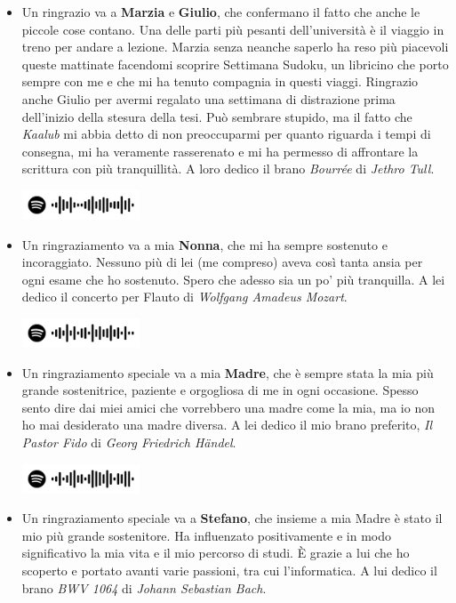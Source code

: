 \documentclass[./main.tex]{subfiles}
\begin{document}
\begin{itemize}
    \item Un ringrazio va a \textbf{Marzia} e \textbf{Giulio}, che confermano il fatto che anche le piccole cose contano.
    Una delle parti più pesanti dell'università è il viaggio in treno per andare a lezione.
    Marzia senza neanche saperlo ha reso più piacevoli queste mattinate facendomi scoprire Settimana Sudoku,
    un libricino che porto sempre con me e che mi ha tenuto compagnia in questi viaggi.
    Ringrazio anche Giulio per avermi regalato una settimana di distrazione prima dell'inizio della stesura della tesi.
    Può sembrare stupido, ma il fatto che \textit{Kaalub} mi abbia detto di non preoccuparmi per quanto riguarda i tempi di consegna, 
    mi ha veramente rasserenato e mi ha permesso di affrontare la scrittura con più tranquillità.
    A loro dedico il brano \textit{Bourrée} di \textit{Jethro Tull}.

    \includegraphics[width=3.5cm]{images/7_ringraziamenti/marzia_giulio.png}

    \item Un ringraziamento va a mia \textbf{Nonna}, che mi ha sempre sostenuto e incoraggiato. 
    Nessuno più di lei (me compreso) aveva così tanta ansia per ogni esame che ho sostenuto.
    Spero che adesso sia un po' più tranquilla.
    A lei dedico il concerto per Flauto di \textit{Wolfgang Amadeus Mozart}.

    \includegraphics[width=3.5cm]{images/7_ringraziamenti/nonna.png}
    
    \item Un ringraziamento speciale va a mia \textbf{Madre}, che è sempre stata la mia più grande sostenitrice,
    paziente e orgogliosa di me in ogni occasione.
    Spesso sento dire dai miei amici che vorrebbero una madre come la mia, ma io non ho mai desiderato una madre diversa.
    A lei dedico il mio brano preferito, \textit{Il Pastor Fido} di \textit{Georg Friedrich Händel}.
    
    \includegraphics[width=3.5cm]{images/7_ringraziamenti/mamma.png}

    \item Un ringraziamento speciale va a \textbf{Stefano}, che insieme a mia Madre è stato il mio più grande sostenitore.
    Ha influenzato positivamente e in modo significativo la mia vita e il mio percorso di studi. 
    È grazie a lui che ho scoperto e portato avanti varie passioni, tra cui l'informatica.
    A lui dedico il brano \textit{BWV 1064} di \textit{Johann Sebastian Bach}.


\end{itemize}
\end{document}
